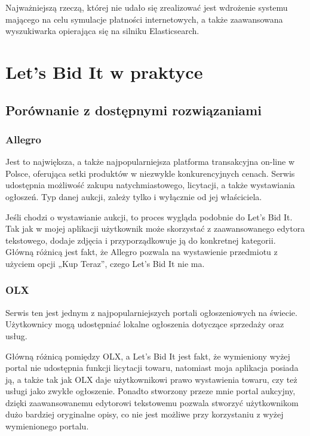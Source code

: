 \documentclass[brudnopis]{xmgr}
\begin{document}
Najważniejszą rzeczą, której nie udało się zrealizować jest wdrożenie systemu mającego na celu symulacje płatności internetowych, a także zaawansowana wyszukiwarka opierająca się na silniku Elasticsearch.


\chapter{Let's Bid It w praktyce}

\section{Porównanie z dostępnymi rozwiązaniami}

\subsection{Allegro}

Jest to największa, a także najpopularniejsza platforma transakcyjna on-line w Polsce, oferująca setki produktów w niezwykle konkurencyjnych cenach. Serwis udostępnia możliwość zakupu natychmiastowego, licytacji, a także wystawiania ogłoszeń. Typ danej aukcji, zależy tylko i wyłącznie od jej właściciela.

Jeśli chodzi o wystawianie aukcji, to proces wygląda podobnie do Let's Bid It. Tak jak w mojej aplikacji użytkownik może skorzystać z zaawansowanego edytora tekstowego, dodaje zdjęcia i przyporządkowuje ją do konkretnej kategorii. Główną różnicą jest fakt, że Allegro pozwala na wystawienie przedmiotu z użyciem opcji „Kup Teraz”, czego Let's Bid It nie ma.

\subsection{OLX}

Serwis ten jest jednym z najpopularniejszych portali ogłoszeniowych na świecie. Użytkownicy
mogą udostępniać lokalne ogłoszenia dotyczące sprzedaży oraz usług.

Główną różnicą pomiędzy OLX, a Let's Bid It jest fakt,
że wymieniony wyżej portal nie udostępnia funkcji licytacji towaru, natomiast moja aplikacja posiada ją, a także tak jak OLX daje użytkownikowi prawo wystawienia towaru, czy też usługi jako zwykłe ogłoszenie. Ponadto stworzony przeze mnie portal aukcyjny, dzięki zaawansowanemu edytorowi tekstowemu pozwala stworzyć użytkownikom dużo bardziej oryginalne opisy, co nie jest możliwe przy korzystaniu z wyżej wymienionego portalu.
\end{document}
